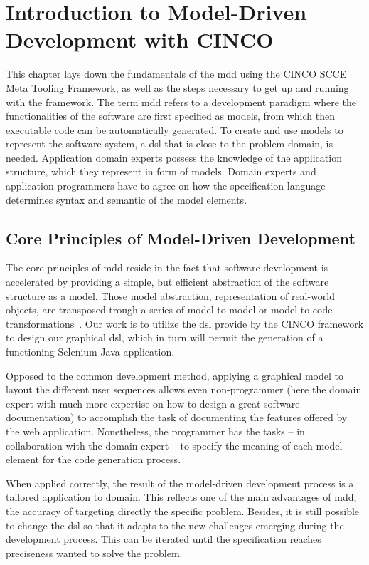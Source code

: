 
\chapter{Introduction to Model-Driven Development with CINCO}\label{ch:Basis}

This chapter lays down the fundamentals of the \acrfull{mdd} using the CINCO SCCE Meta Tooling Framework, as well as the steps necessary to get up and running with the framework. The term \acrshort{mdd} refers to a development paradigm where the functionalities of the software are first specified as models, from which then executable code can be automatically generated. To create and use models to represent the software system, a \acrfull{dsl} that is close to the problem domain, is needed. Application domain experts possess the knowledge of the application structure, which they represent in form of models. Domain experts and application programmers have to agree on how the specification language determines syntax and semantic of the model elements.

\section{Core Principles of Model-Driven Development}

The core principles of \acrfull{mdd} reside in the fact that software development is accelerated by providing a simple, but efficient abstraction of the software structure as a model. Those model abstraction, representation of real-world objects, are transposed trough a series of model-to-model or model-to-code transformations~\cite{stahl_et_al}. Our work is to utilize the \acrshort{dsl} provide by the CINCO framework to design our graphical \acrshort{dsl}, which in turn will permit the generation of a functioning \gls{Selenium} Java application.

Opposed to the common development method, applying a graphical model to layout the different user sequences allows even non-programmer (here the domain expert with much more expertise on how to design a great software documentation) to accomplish the task of documenting the features offered by the web application. Nonetheless, the programmer has the tasks -- in collaboration with the domain expert -- to specify the meaning of each model element for the code generation process.

When applied correctly, the result of the model-driven development process is a tailored application to domain. This reflects one of the main advantages of \acrshort{mdd}, the accuracy of targeting directly the specific problem. Besides, it is still possible to change the \acrshort{dsl} so that it adapts to the new challenges emerging during the development process. This can be iterated until the specification reaches preciseness wanted to solve the problem.

